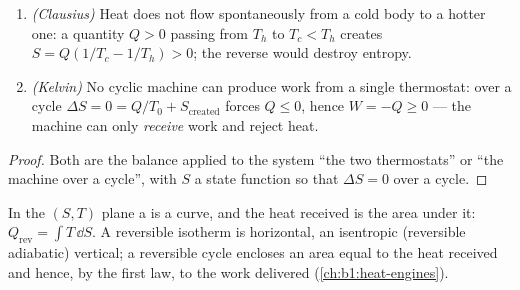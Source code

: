 \begin{proposition}\label{prop:b1:second-law-entropy:clausiuskelvin}
\begin{enumerate}
  \item \emph{(Clausius)} Heat does not flow spontaneously from a cold
        body to a hotter one: a quantity $Q > 0$ passing from $T_h$ to
        $T_c < T_h$ creates $S = Q(1/T_c - 1/T_h) > 0$; the reverse would
        destroy entropy.
  \item \emph{(Kelvin)} No cyclic machine can produce work from a single
        thermostat: over a cycle $\Delta S = 0 = Q/T_0 + S_{\mathrm{created}}$
        forces $Q \leq 0$, hence $W = -Q \geq 0$ --- the machine can only
        \emph{receive} work and reject heat.
\end{enumerate}
\end{proposition}

\begin{proof}
Both are the balance applied to the system ``the two thermostats'' or
``the machine over a cycle'', with $S$ a state function so that $\Delta S
= 0$ over a cycle.
\end{proof}

\begin{definition}\label{def:b1:second-law-entropy:TS}
In the $(S, T)$ plane a  is a curve, and the
heat received is the area under it: $Q_{\mathrm{rev}} = \int T\,\dd S$. A
reversible isotherm is horizontal, an isentropic (reversible adiabatic)
vertical; a reversible cycle encloses an area equal to the heat received
and hence, by the first law, to the work delivered
(\cref{ch:b1:heat-engines}).
\end{definition}

